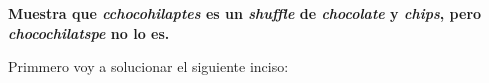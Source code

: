 \textbf{Muestra que \textit{cchocohilaptes} es un \textit{shuffle} de \textit{chocolate} y \textit{chips}, pero \textit{chocochilatspe} no lo es.}\vspace{.2cm}

Primmero voy a solucionar el siguiente inciso:

\textcolor{bibi}{}
\begin{quote}
    
\end{quote}

